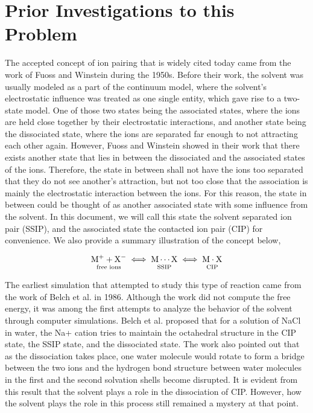 \section{Prior Investigations to this Problem}

\begin{spacing}{2.0}

    The accepted concept of ion pairing that is widely cited today came from the work of Fuoss \cite{P-JACS-1954-v76-Sadek} and Winstein 
    \cite{P-JACS-1956-v78-Winstein} during the 1950s. Before their work, the solvent was usually modeled as a part of the continuum model, where 
    the solvent's electrostatic influence was treated as one single entity, which gave rise to a two-state model. One of those two states being 
    the associated states, where the ions are held close together by their electrostatic interactions, and another state being the dissociated 
    state, where the ions are separated far enough to not attracting each other again. However, Fuoss and Winstein showed in their work that 
    there exists another state that lies in between the dissociated and the associated states of the ions. Therefore, the state in between shall 
    not have the ions too separated that they do not see another's attraction, but not too close that the association is mainly the electrostatic 
    interaction between the ions. For this reason, the state in between could be thought of as another associated state with some influence from 
    the solvent. In this document, we will call this state the solvent separated ion pair (SSIP), and the associated state the contacted ion pair 
    (CIP) for convenience. We also provide a summary illustration of the concept below,

    \begin{equation}
        \underset{\text{free ions}}{\mathrm{M}^+ + \mathrm{X}^-\vphantom{p}} \iff
        \underset{\text{SSIP}}{\mathrm{M} \cdots \mathrm{X}\vphantom{p}} \iff
        \underset{\text{CIP}}{\mathrm{M} \cdot \mathrm{X}\vphantom{p}}
        \label{eq:c1s1-ionpairillus}
    \end{equation} 

    The earliest simulation that attempted to study this type of reaction came from the work of Belch et al. in 1986. \cite{P-JACS-1986-v108-Belch} 
    Although the work did not compute the free energy, it was among the first attempts to analyze the behavior of the solvent through computer 
    simulations. Belch et al. proposed that for a solution of NaCl in water, the Na+ cation tries to maintain the octahedral structure in the CIP 
    state, the SSIP state, and the dissociated state. The work also pointed out that as the dissociation takes place, one water molecule would 
    rotate to form a bridge between the two ions and the hydrogen bond structure between water molecules in the first and the second solvation 
    shells become disrupted. It is evident from this result that the solvent plays a role in the dissociation of CIP. However, how the solvent 
    plays the role in this process still remained a mystery at that point.


\end{spacing}
